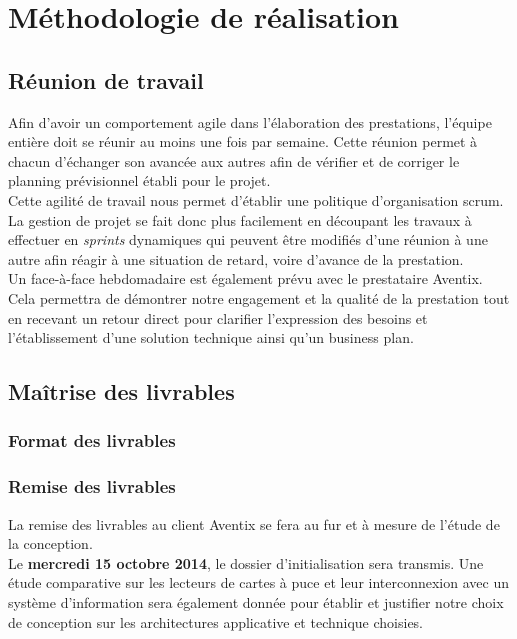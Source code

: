 \section{Méthodologie de réalisation}
\subsection{Réunion de travail}
Afin d'avoir un comportement agile dans l'élaboration des prestations, l'équipe
entière doit se réunir au moins une fois par semaine. Cette réunion permet à
chacun d'échanger son avancée aux autres afin de vérifier et de corriger le
planning prévisionnel établi pour le projet. \\

Cette agilité de travail nous permet d'établir une politique d'organisation
scrum. La gestion de projet se fait donc plus facilement en découpant les
travaux à effectuer en \textit{sprints} dynamiques qui peuvent être modifiés
d'une réunion à une autre afin réagir à une situation de retard, voire d'avance
de la prestation. \\

Un face-à-face hebdomadaire est également prévu avec le prestataire Aventix.
Cela permettra de démontrer notre engagement et la qualité de la prestation
tout en recevant un retour direct pour clarifier l'expression des besoins et
l'établissement d'une solution technique ainsi qu'un business plan. \\

\subsection{Maîtrise des livrables}
\subsubsection{Format des livrables}

\subsubsection{Remise des livrables}
La remise des livrables au client Aventix se fera au fur et à mesure de l'étude
de la conception. \\

Le \textbf{mercredi 15 octobre 2014}, le dossier d'initialisation sera transmis.
Une étude comparative sur les lecteurs de cartes à puce et leur interconnexion
avec un système d'information sera également donnée pour établir et justifier
notre choix de conception sur les architectures applicative et technique
choisies. \\


